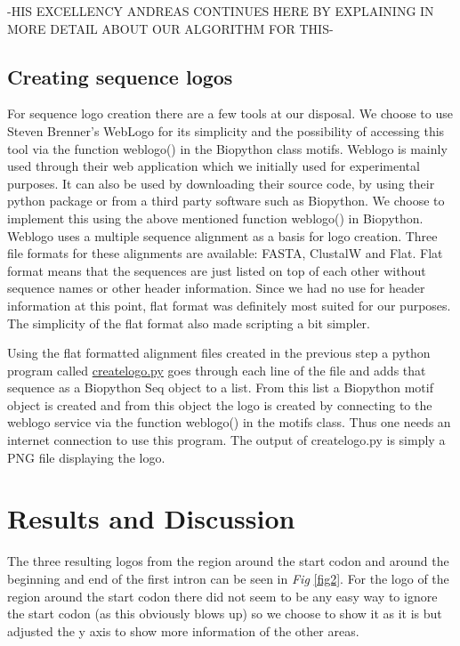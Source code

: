 \documentclass[10pt,letterpaper]{article}
\begin{document}
-HIS EXCELLENCY ANDREAS CONTINUES HERE BY EXPLAINING IN MORE DETAIL ABOUT OUR ALGORITHM FOR THIS-

\subsection*{Creating sequence logos}
For sequence logo creation there are a few tools at our disposal. We choose to use Steven Brenner's WebLogo \cite{bib6} for its simplicity and the possibility of accessing this tool via the function weblogo() in the Biopython class motifs. Weblogo is mainly used through their web application which we initially used for experimental purposes. It can also be used by downloading their source code, by using their python package or from a third party software such as Biopython. We choose to implement this using the above mentioned function weblogo() in Biopython. Weblogo uses a multiple sequence alignment as a basis for logo creation. Three file formats for these alignments are available: FASTA, ClustalW and Flat. Flat format means that the sequences are just listed on top of each other without sequence names or other header information. Since we had no use for header information at this point, flat format was definitely most suited for our purposes. The simplicity of the flat format also made scripting a bit simpler.

Using the flat formatted alignment files created in the previous step a python program called \href{https://github.com/jolo2486/unravel_motifs/blob/master/bin/createlogo.py}{createlogo.py} goes through each line of the file and adds that sequence as a Biopython Seq object to a list. From this list a Biopython motif object is created and from this object the logo is created by connecting to the weblogo service via the function weblogo() in the motifs class. Thus one needs an internet connection to use this program. The output of createlogo.py is simply a PNG file displaying the logo.

\section*{Results and Discussion}
The three resulting logos from the region around the start codon and around the beginning and end of the first intron can be seen in \textit{Fig} \ref{fig2}. For the logo of the region around the start codon there did not seem to be any easy way to ignore the start codon (as this obviously blows up) so we choose to show it as it is but adjusted the y axis to show more information of the other areas.
\end{document}
